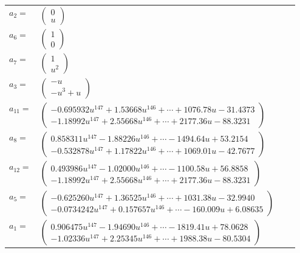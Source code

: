 \documentclass[1p]{elsarticle_modified}
\theoremstyle{definition}
\begin{document}
\begin{tabular}{m{7pt} m{180pt} m{7pt} m{180pt} }
\flushright $a_{2}=$&$\begin{pmatrix}0\\u\end{pmatrix}$ \\
\flushright $a_{6}=$&$\begin{pmatrix}1\\0\end{pmatrix}$ \\
\flushright $a_{7}=$&$\begin{pmatrix}1\\u^2\end{pmatrix}$ \\
\flushright $a_{3}=$&$\begin{pmatrix}- u\\- u^3+u\end{pmatrix}$ \\
\flushright $a_{11}=$&$\begin{pmatrix}-0.695932 u^{147}+1.53668 u^{146}+\cdots+1076.78 u-31.4373\\-1.18992 u^{147}+2.55668 u^{146}+\cdots+2177.36 u-88.3231\end{pmatrix}$ \\
\flushright $a_{8}=$&$\begin{pmatrix}0.858311 u^{147}-1.88226 u^{146}+\cdots-1494.64 u+53.2154\\-0.532878 u^{147}+1.17822 u^{146}+\cdots+1069.01 u-42.7677\end{pmatrix}$ \\
\flushright $a_{12}=$&$\begin{pmatrix}0.493986 u^{147}-1.02000 u^{146}+\cdots-1100.58 u+56.8858\\-1.18992 u^{147}+2.55668 u^{146}+\cdots+2177.36 u-88.3231\end{pmatrix}$ \\
\flushright $a_{5}=$&$\begin{pmatrix}-0.625260 u^{147}+1.36525 u^{146}+\cdots+1031.38 u-32.9940\\-0.0734242 u^{147}+0.157657 u^{146}+\cdots-160.009 u+6.08635\end{pmatrix}$ \\
\flushright $a_{1}=$&$\begin{pmatrix}0.906475 u^{147}-1.94690 u^{146}+\cdots-1819.41 u+78.0628\\-1.02336 u^{147}+2.25345 u^{146}+\cdots+1988.38 u-80.5304\end{pmatrix}$ \\

\end{tabular}
\end{document}
